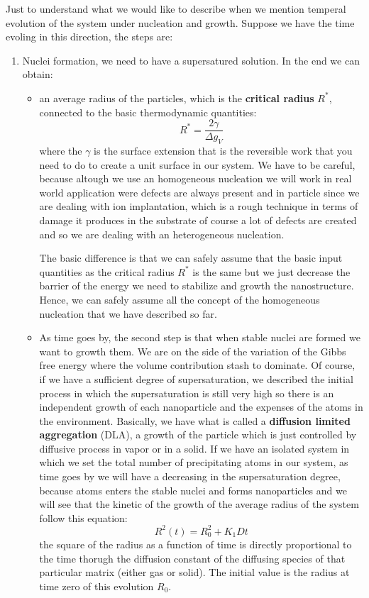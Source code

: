 \documentclass[../main/main.tex]{subfiles}
\begin{document}
Just to understand what we would like to describe when we mention temperal evolution of the system under nucleation and growth.
Suppose we have the time evoling in this direction, the steps are:
\begin{enumerate}
\item Nuclei formation, we need to have a supersatured solution.
In the end we can obtain:
\begin{itemize}
\item an average radius of the particles, which is the \textbf{critical radius} \( R^* \), connected to the basic thermodynamic quantities:
\begin{equation*}
  R^* = \frac{2 \gamma  }{\Delta g_V}
\end{equation*}
where the \( \gamma   \) is the surface extension that is the reversible work that you need to do to create a unit surface in our system. We have to be careful, because altough we use an homogeneous nucleation we will work in real world application were defects are always present and in particle since we are dealing with ion implantation, which is a rough technique in terms of damage it produces in the substrate of course a lot of defects are created and so we are dealing with an heterogeneous nucleation.

The basic difference is that we can safely assume that the basic input quantities as the critical radius \( R^* \) is the same but we just decrease the barrier of the energy we need to stabilize and growth the nanostructure.
Hence, we can safely assume all the concept of the homogeneous nucleation that we have described so far.

\item As time goes by, the second step is that when stable nuclei are formed we want to growth them. We are on the side of the variation of the Gibbs free energy where the volume contribution stash to dominate. Of course, if we have a sufficient degree of supersaturation, we described the initial process in which the supersaturation is still very high so there is an independent growth of each nanoparticle and the expenses of the atoms in the environment.  Basically, we have what is called a \textbf{diffusion limited aggregation} (DLA), a growth of the particle which is just controlled by diffusive process in vapor or in a solid. If we have an isolated system in which we set the total number of precipitating atoms in our system, as time goes by we will have a decreasing in the supersaturation degree, because atoms enters the stable nuclei and forms nanoparticles and we will see that the kinetic of the growth of the average radius of the system follow this equation:
\begin{equation*}
  R^2 (t) = R_0^2 + K_1 D t
\end{equation*}
the square of the radius as a function of time is directly proportional to the time thorugh the diffusion constant of the diffusing species of that particular matrix (either gas or solid).
The initial value is the radius at time zero of this evolution \( R_0 \).


\end{itemize}
\end{enumerate}
\end{document}
